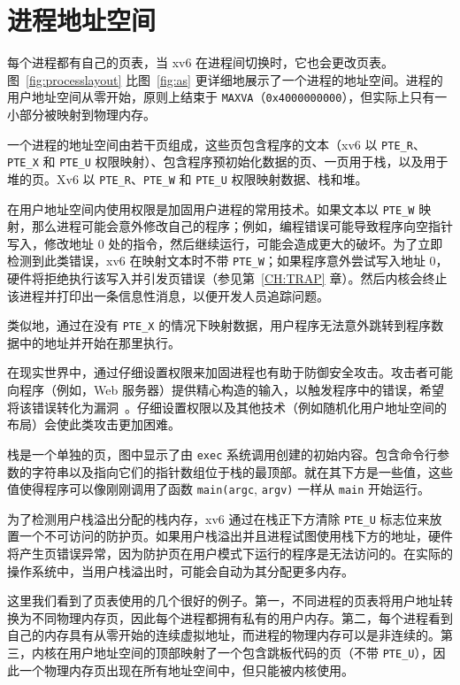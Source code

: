 \section{进程地址空间}
每个进程都有自己的页表，当 xv6 在进程间切换时，它也会更改页表。图~\ref{fig:processlayout} 比图~\ref{fig:as} 更详细地展示了一个进程的地址空间。进程的用户地址空间从零开始，原则上结束于 \texttt{MAXVA}（{\tt 0x4000000000}），但实际上只有一小部分被映射到物理内存。

一个进程的地址空间由若干页组成，这些页包含程序的文本（xv6 以 \lstinline{PTE_R}、\lstinline{PTE_X} 和 \lstinline{PTE_U} 权限映射）、包含程序预初始化数据的页、一页用于栈，以及用于堆的页。Xv6 以 \lstinline{PTE_R}、\lstinline{PTE_W} 和 \lstinline{PTE_U} 权限映射数据、栈和堆。

在用户地址空间内使用权限是加固用户进程的常用技术。如果文本以 \lstinline{PTE_W} 映射，那么进程可能会意外修改自己的程序；例如，编程错误可能导致程序向空指针写入，修改地址 0 处的指令，然后继续运行，可能会造成更大的破坏。为了立即检测到此类错误，xv6 在映射文本时不带 \lstinline{PTE_W}；如果程序意外尝试写入地址 0，硬件将拒绝执行该写入并引发页错误（参见第~\ref{CH:TRAP} 章）。然后内核会终止该进程并打印出一条信息性消息，以便开发人员追踪问题。

类似地，通过在没有 \lstinline{PTE_X} 的情况下映射数据，用户程序无法意外跳转到程序数据中的地址并开始在那里执行。

在现实世界中，通过仔细设置权限来加固进程也有助于防御安全攻击。攻击者可能向程序（例如，Web 服务器）提供精心构造的输入，以触发程序中的错误，希望将该错误转化为漏洞~\cite{aleph:smashing}。仔细设置权限以及其他技术（例如随机化用户地址空间的布局）会使此类攻击更加困难。

栈是一个单独的页，图中显示了由 {\tt exec} 系统调用创建的初始内容。包含命令行参数的字符串以及指向它们的指针数组位于栈的最顶部。就在其下方是一些值，这些值使得程序可以像刚刚调用了函数 \lstinline{main(argc}, \lstinline{argv)} 一样从 \lstinline{main} 开始运行。

为了检测用户栈溢出分配的栈内存，xv6 通过在栈正下方清除 \lstinline{PTE_U} 标志位来放置一个不可访问的防护页。如果用户栈溢出并且进程试图使用栈下方的地址，硬件将产生页错误异常，因为防护页在用户模式下运行的程序是无法访问的。在实际的操作系统中，当用户栈溢出时，可能会自动为其分配更多内存。

这里我们看到了页表使用的几个很好的例子。第一，不同进程的页表将用户地址转换为不同物理内存页，因此每个进程都拥有私有的用户内存。第二，每个进程看到自己的内存具有从零开始的连续虚拟地址，而进程的物理内存可以是非连续的。第三，内核在用户地址空间的顶部映射了一个包含跳板代码的页（不带 \lstinline{PTE_U}），因此一个物理内存页出现在所有地址空间中，但只能被内核使用。

